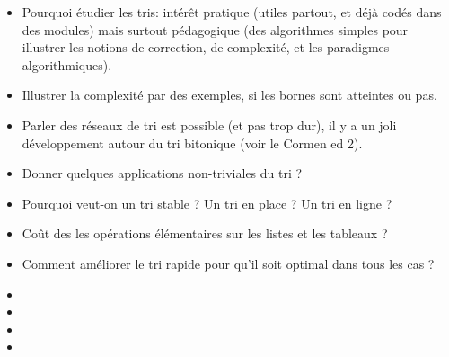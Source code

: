 \documentclass{agregfiche}
\begin{document}
\secidees

\begin{itemize}
    \item Pourquoi étudier les tris: intérêt pratique (utiles partout, et déjà codés dans des modules) mais surtout pédagogique (des algorithmes simples pour illustrer les notions de correction, de complexité, et les paradigmes algorithmiques).
    
            \item Illustrer la complexité par des exemples, si les bornes sont atteintes ou pas.
    
    \item Parler des réseaux de tri est possible (et pas trop dur), il y a un joli développement autour du tri bitonique (voir le Cormen ed 2).
    


\end{itemize}

\secquestionsclassiques

\begin{itemize}
    \item Donner quelques applications non-triviales du tri ?
    \item Pourquoi veut-on un tri stable ? Un tri en place ? Un tri en ligne ?
    \item Coût des les opérations élémentaires sur les listes et les tableaux ?
    \item Comment améliorer le tri rapide pour qu'il soit optimal dans tous les cas ?
\end{itemize}

\secreferences

\secdev

\begin{itemize}
\item {}
\item {}
\item {}
\item {}

\end{itemize}
\end{document}
